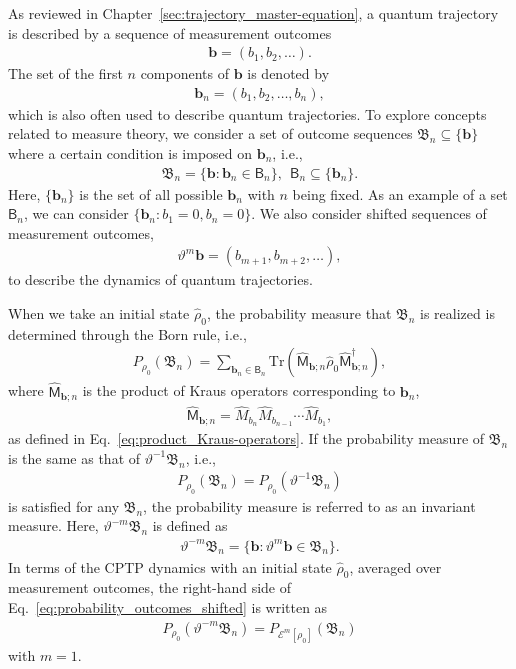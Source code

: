 \documentclass[preprint,pteplogo]{ptephy_v2}%
\numberwithin{equation}{section}
\theoremstyle{definition}
\begin{document}
As reviewed in Chapter~\ref{sec:trajectory_master-equation}, a quantum trajectory is described by a sequence of measurement outcomes
\begin{align}
    \bm{b}=(b_1,b_2,\ldots).
\end{align}
The set of the first $n$ components of $\bm{b}$ is denoted by
\begin{align}
    \bm{b}_n=(b_1,b_2,\ldots,b_n),
\end{align}
which is also often used to describe quantum trajectories. 
To explore concepts related to measure theory, we consider a set of outcome sequences $\mathfrak{B}_n \subseteq \{ \bm{b} \}$ where a certain condition is imposed on $\bm{b}_n$, i.e., 
\begin{align}
    \mathfrak{B}_n=\{\bm{b}:\bm{b}_n\in\mathsf{B}_n\},\ \ \mathsf{B}_n \subseteq \{\bm{b}_n\}.
\end{align}
Here, $\{\bm{b}_n\}$ is the set of all possible $\bm{b}_n$ with $n$ being fixed. 
As an example of a set $\mathsf{B}_n$, we can consider $\{\bm{b}_n:b_1=0,b_n=0\}$. 
We also consider shifted sequences of measurement outcomes,
\begin{align}\label{eq:shift}
    \vartheta^m\bm{b}=(b_{m+1},b_{m+2},\ldots),
\end{align}
to describe the dynamics of quantum trajectories.

When we take an initial state $\hat{\rho}_0$, the probability measure that $\mathfrak{B}_n$ is realized is determined through the Born rule, i.e., 
\begin{align}
    P_{\rho_0}(\mathfrak{B}_n)
    =\sum_{\bm{b}_n \in \mathsf{B}_n}\mathrm{Tr}
    \left(\hat{\mathsf{M}}_{\bm{b};n}\hat{\rho}_0\hat{\mathsf{M}}_{\bm{b};n}^\dagger\right),
    \label{eq:born-rule}
\end{align}
where $\hat{\mathsf{M}}_{\bm{b};n}$ is the product of Kraus operators corresponding to $\bm{b}_n$,
\begin{align}
    \hat{\mathsf{M}}_{\bm{b};n}=\hat{M}_{b_n}\hat{M}_{b_{n-1}}\cdots\hat{M}_{b_1},
\end{align}
as defined in Eq.~\eqref{eq:product_Kraus-operators}. 
If the probability measure of $\mathfrak{B}_n$ is the same as that of $\vartheta^{-1}\mathfrak{B}_n$, i.e., 
\begin{align}
    P_{\rho_0}(\mathfrak{B}_n)=P_{\rho_0}(\vartheta^{-1}\mathfrak{B}_n)
    \label{eq:probability_outcomes_shifted}
\end{align}
is satisfied for any $\mathfrak{B}_n$, the probability measure is referred to as an invariant measure. 
Here, $\vartheta^{-m}\mathfrak{B}_n$ is defined as 
\begin{align}
    \vartheta^{-m}\mathfrak{B}_n=\{\bm{b}:\vartheta^m\bm{b} \in \mathfrak{B}_n\}.
\end{align}
In terms of the CPTP dynamics with an initial state $\hat{\rho}_0$, averaged over measurement outcomes, the right-hand side of Eq.~\eqref{eq:probability_outcomes_shifted} is written as 
\begin{align}
    P_{\rho_0}(\vartheta^{-m}\mathfrak{B}_n)
    =P_{\mathcal{E}^m[\rho_0]}(\mathfrak{B}_n)
    \label{eq:shift_probability-measure}
\end{align}
with $m=1$.
\end{document}

